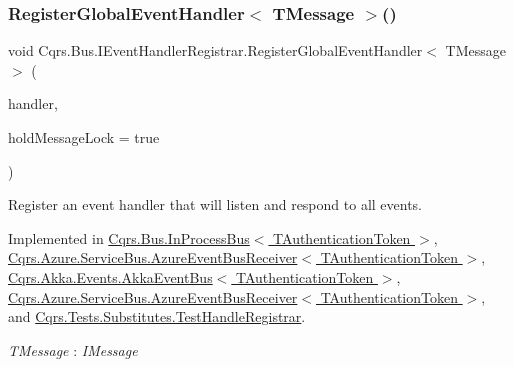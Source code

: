 \subsubsection{\texorpdfstring{Register\+Global\+Event\+Handler$<$ T\+Message $>$()}{RegisterGlobalEventHandler< TMessage >()}}
{\footnotesize\ttfamily void Cqrs.\+Bus.\+I\+Event\+Handler\+Registrar.\+Register\+Global\+Event\+Handler$<$ T\+Message $>$ (\begin{DoxyParamCaption}\item[{Action$<$ T\+Message $>$}]{handler,  }\item[{bool}]{hold\+Message\+Lock = {\ttfamily true} }\end{DoxyParamCaption})}



Register an event handler that will listen and respond to all events. 



Implemented in \hyperlink{classCqrs_1_1Bus_1_1InProcessBus_ad9c2a857323c70f07eb0eb5632ec63e7_ad9c2a857323c70f07eb0eb5632ec63e7}{Cqrs.\+Bus.\+In\+Process\+Bus$<$ T\+Authentication\+Token $>$}, \hyperlink{classCqrs_1_1Azure_1_1ServiceBus_1_1AzureEventBusReceiver_a86f83510ec3d33931e37cfe6b0fb83db_a86f83510ec3d33931e37cfe6b0fb83db}{Cqrs.\+Azure.\+Service\+Bus.\+Azure\+Event\+Bus\+Receiver$<$ T\+Authentication\+Token $>$}, \hyperlink{classCqrs_1_1Akka_1_1Events_1_1AkkaEventBus_ab0df68070fbc625cad5cd2e74667b01d_ab0df68070fbc625cad5cd2e74667b01d}{Cqrs.\+Akka.\+Events.\+Akka\+Event\+Bus$<$ T\+Authentication\+Token $>$}, \hyperlink{classCqrs_1_1Azure_1_1ServiceBus_1_1AzureEventBusReceiver_a86f83510ec3d33931e37cfe6b0fb83db_a86f83510ec3d33931e37cfe6b0fb83db}{Cqrs.\+Azure.\+Service\+Bus.\+Azure\+Event\+Bus\+Receiver$<$ T\+Authentication\+Token $>$}, and \hyperlink{classCqrs_1_1Tests_1_1Substitutes_1_1TestHandleRegistrar_a6fd2aec4c9924697b2d025d55c085502_a6fd2aec4c9924697b2d025d55c085502}{Cqrs.\+Tests.\+Substitutes.\+Test\+Handle\+Registrar}.

\begin{Desc}
\item[Type Constraints]\begin{description}
\item[{\em T\+Message} : {\em I\+Message}]\end{description}
\end{Desc}
